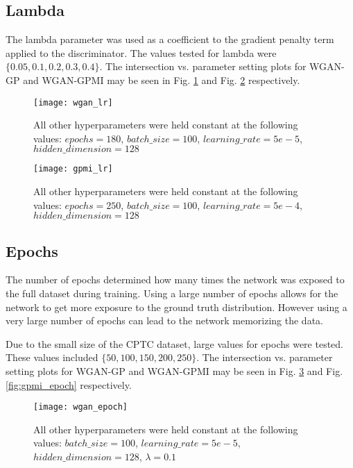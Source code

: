 
\subsection{Lambda}
The lambda parameter was used as a coefficient to the gradient penalty term applied to the discriminator. The values tested for lambda were $\{0.05, 0.1, 0.2, 0.3, 0.4\}$. The intersection vs. parameter setting plots for WGAN-GP and WGAN-GPMI may be seen in Fig. \ref{fig:wgan_lam} and Fig. \ref{fig:gpmi_lam} respectively.

\begin{figure}[!htbp]
	\centering%
	\texttt{[image: wgan\_lr]}
	\caption{
		All other hyperparameters were held constant at the following values: $epochs=180$, $batch\_size = 100$, $learning\_rate=5e-5$, $hidden\_dimension=128$
	}
	\label{fig:wgan_lam}
\end{figure}

\begin{figure}[!htbp]
	\centering%
	\texttt{[image: gpmi\_lr]}
	\caption{
		All other hyperparameters were held constant at the following values: $epochs=250$, $batch\_size=100$, $learning\_rate=5e-4$, $hidden\_dimension=128$
	}
	\label{fig:gpmi_lam}
\end{figure}


\subsection{Epochs}
The number of epochs determined how many times the network was exposed to the full dataset during training. Using a large number of epochs allows for the network to get more exposure to the ground truth distribution. However using a very large number of epochs can lead to the network memorizing the data. 

Due to the small size of the CPTC dataset, large values for epochs were tested. These values included $\{50, 100, 150, 200, 250\}$. The intersection vs. parameter setting plots for WGAN-GP and WGAN-GPMI may be seen in Fig. \ref{fig:wgan_epoch} and Fig. \ref{fig:gpmi_epoch} respectively. 

\begin{figure}[!htbp]
	\centering%
	\texttt{[image: wgan\_epoch]}
	\caption{
		All other hyperparameters were held constant at the following values: $batch\_size = 100$, $learning\_rate=5e-5$, $hidden\_dimension=128$, $\lambda=0.1$
	}
	\label{fig:wgan_epoch}
\end{figure}

